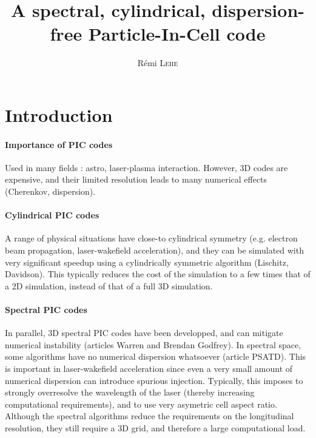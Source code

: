 \documentclass[a4paper]{article}   	%
\title{A spectral, cylindrical, dispersion-free Particle-In-Cell code}
\date{}
\author{R\'emi \textsc{Lehe}}
\begin{document}
\maketitle


\section*{Introduction}

\paragraph{Importance of PIC codes } Used in many fields : astro, laser-plasma interaction. However, 3D codes are expensive, and their limited resolution leads to many numerical effects (Cherenkov, dispersion).

\paragraph{Cylindrical PIC codes} A range of physical situations have close-to cylindrical symmetry (e.g. electron beam propagation, laser-wakefield acceleration), and they can be simulated with very significant speedup using a cylindrically symmetric algorithm (Lischitz, Davidson). This typically reduces the cost of the simulation to a few times that of a 2D simulation, instead of that of a full 3D simulation.

\paragraph{Spectral PIC codes} In parallel, 3D spectral PIC codes have been developped, and can mitigate numerical instability (articles Warren and Brendan Godfrey). In spectral space, some algorithms have no numerical dispersion whatsoever (article PSATD). This is important in laser-wakefield acceleration since even a very small amount of numerical dispersion can introduce spurious injection. Typically, this imposes to strongly overresolve the wavelength of the laser (thereby increasing computational requirements), and to use very asymetric cell aspect ratio. Although the spectral algorithms reduce the requirements on the longitudinal resolution, they still require a 3D grid, and therefore a large computational load.
\end{document}
